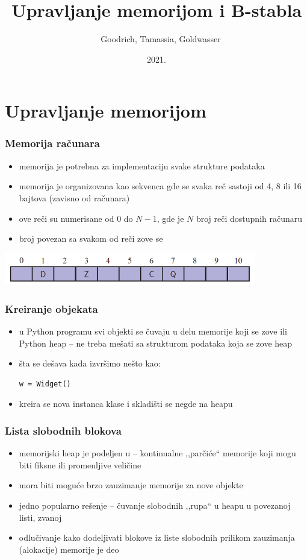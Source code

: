 \documentclass[compress,aspectratio=169]{beamer}
\title{Upravljanje memorijom i B-stabla}
\author{\textcopyright \ \ Goodrich, Tamassia, Goldwasser}
\institute{Katedra za informatiku, Fakultet tehničkih nauka, Univerzitet u
Novom Sadu}
\date{2021.}
\begin{document}
\frame{\titlepage}

\section[Memorija]{Upravljanje memorijom}

\begin{frame}[fragile]
  \frametitle{Memorija računara}
  \begin{itemize}
    \item memorija je potrebna za implementaciju svake strukture podataka
    \item memorija je organizovana kao sekvenca  gde se svaka
    reč sastoji od 4, 8 ili 16 bajtova (zavisno od računara)
    \item ove reči su numerisane od $0$ do $N-1$, gde je $N$ broj reči
    dostupnih računaru
    \item broj povezan sa svakom od reči zove se 
  \end{itemize}
  \begin{center}
    \includegraphics[width=11cm]{asp-15-pic01.png}
  \end{center}
\end{frame}

\begin{frame}[fragile]
  \frametitle{Kreiranje objekata}
  \begin{itemize}
    \item u Python programu svi objekti se čuvaju u delu memorije koji 
    se zove  ili Python heap -- ne treba mešati sa 
    strukturom podataka koja se zove heap
    \item šta se dešava kada izvršimo nešto kao:
\begin{verbatim}
w = Widget()
\end{verbatim}
    \item kreira se nova instanca klase i skladišti se negde na heapu
  \end{itemize}
\end{frame}

\begin{frame}[fragile]
  \frametitle{Lista slobodnih blokova}
  \begin{itemize}
    \item memorijski heap je podeljen u  -- kontinualne 
    ,,parčiće`` memorije koji mogu biti fiksne ili promenljive veličine
    \item mora biti moguće brzo zauzimanje memorije za nove objekte
    \item jedno popularno rešenje -- čuvanje slobodnih ,,rupa`` u heapu
    u povezanoj listi, zvanoj 
    \item odlučivanje kako dodeljivati blokove iz liste slobodnih 
    prilikom zauzimanja (alokacije) memorije je deo 
  \end{itemize}
\end{frame}
\end{document}

